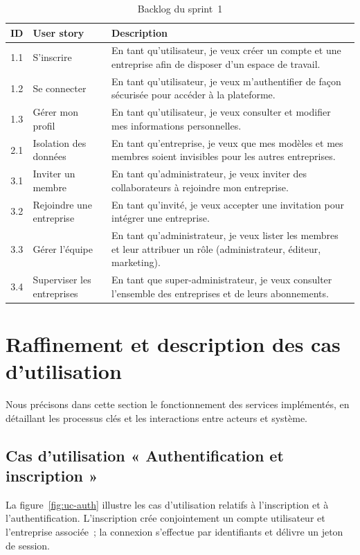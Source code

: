 \documentclass[12pt,a4paper,oneside]{report}
\begin{document}
\begin{table}[H]
\centering
\caption{Backlog du sprint~1}
\label{tab:backlog-s1}
\small
\begin{tabularx}{\linewidth}{clX}
\toprule
\textbf{ID} & \textbf{User story} & \textbf{Description} \\
\midrule
1.1 & S'inscrire & En tant qu'utilisateur, je veux créer un compte et une entreprise afin de disposer d'un espace de travail. \\
1.2 & Se connecter & En tant qu'utilisateur, je veux m'authentifier de façon sécurisée pour accéder à la plateforme. \\
1.3 & Gérer mon profil & En tant qu'utilisateur, je veux consulter et modifier mes informations personnelles. \\
2.1 & Isolation des données & En tant qu'entreprise, je veux que mes modèles et mes membres soient invisibles pour les autres entreprises. \\
3.1 & Inviter un membre & En tant qu'administrateur, je veux inviter des collaborateurs à rejoindre mon entreprise. \\
3.2 & Rejoindre une entreprise & En tant qu'invité, je veux accepter une invitation pour intégrer une entreprise. \\
3.3 & Gérer l'équipe & En tant qu'administrateur, je veux lister les membres et leur attribuer un rôle (administrateur, éditeur, marketing). \\
3.4 & Superviser les entreprises & En tant que super-administrateur, je veux consulter l'ensemble des entreprises et de leurs abonnements. \\
\bottomrule
\end{tabularx}
\end{table}

\section{Raffinement et description des cas d'utilisation}
Nous précisons dans cette section le fonctionnement des services
implémentés, en détaillant les processus clés et les interactions entre
acteurs et système.

\subsection{Cas d'utilisation « Authentification et inscription »}
La figure~\ref{fig:uc-auth} illustre les cas d'utilisation relatifs à
l'inscription et à l'authentification. L'inscription crée conjointement un
compte utilisateur et l'entreprise associée~; la connexion s'effectue par
identifiants et délivre un jeton de session.
\end{document}
